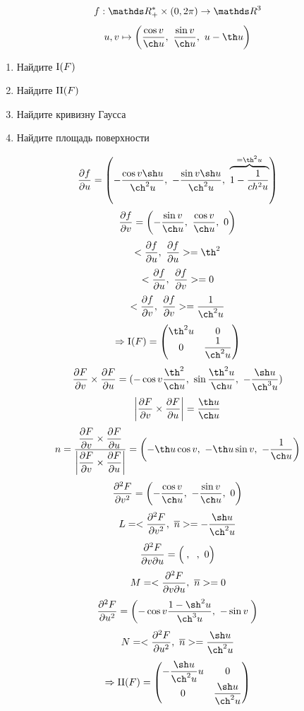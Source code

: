 \documentclass[main]{subfiles}
\begin{document}

    \begin{Example}
      \[f: \R_+^* \times (0, 2\pi) \ra \R^3\]
      \[u,v \mapsto \Br{\dfrac{\cos v}{\ch u},\ \dfrac{\sin v}{\ch u},\ u - \th u}\]
      \begin{enumerate}
        \item Найдите $\RNumb{1}(F)$
        \item Найдите $\RNumb{2}(F)$
        \item Найдите кривизну Гаусса
        \item Найдите площадь поверхности
      \end{enumerate}
    \end{Example}

    \begin{Sol}
      \[\dfrac{\d f}{\d u} = \Br{-\dfrac{\cos v \sh u}{\ch^2 u},\ -\dfrac{\sin v \sh u}{\ch^2 u},\ \ob{= \th^2 u}{1 - \dfrac{1}{ch^2 u}}}\]
      \[\dfrac{\d f}{\d v} = \Br{-\dfrac{\sin v}{\ch u},\ \dfrac{\cos v}{\ch u},\ 0}\]
      \[<\dfrac{\d f}{\d u},\ \dfrac{\d f}{\d u}> = \th^2\]
      \[<\dfrac{\partial f}{\partial u},\ \dfrac{\partial f}{\partial v}> = 0\]
      \[<\dfrac{\d f}{\d v},\ \dfrac{\d f}{\d v}> = \dfrac{1}{\ch^2 u}\]
      \[\Ra \RNumb{1}(F) = \begin{pmatrix}
        {}\th^2 u & 0\\
        0 & \dfrac{1}{\ch^2 u}
      \end{pmatrix}\]
      \[\frac{\d F}{\d v} \times \frac{\d F}{\d u} =
      (
        -\cos v \dfrac{\th^2}{\ch u},\
        \sin \dfrac{\th^2 u}{\ch u},\
        -\dfrac{\sh u}{\ch^3 u}
      )\]
      \[\abs{\dfrac{\d F}{\d v} \times \dfrac{\d F}{\d u}} = \dfrac{\th u}{\ch u}\]
      \[n =
      \dfrac{
        \dfrac{\d F}{\d v} \times \dfrac{\d F}{\d u}
      }{
        \abs{\dfrac{\d F}{\d v} \times \dfrac{\d F}{\d u}}
      } = \Br{- \th u \cos v,\ -\th u \sin v,\ -\dfrac{1}{\ch u}}\]
      \[\frac{\d^2 F}{\d v^2} = \Br{-\dfrac{\cos v}{\ch u},\ -\dfrac{\sin v}{\ch u},\ 0}\]
      \[L = <\frac{\d^2 F}{\d v^2},\ \ol{n}> = -\dfrac{\sh u}{\ch^2 u}\]
      \[\frac{\partial^2 F}{\partial v \partial u} = \left(\dfrac{}{},\ \dfrac{}{},\ 0\right)\]
      \[M = <\frac{\partial^2 F}{\partial v \partial u},\ \overline{n}> = 0\]
      \[\frac{\d^2 F}{\d u^2} = \Br{-\cos v \dfrac{1-\sh^2 u}{\ch^3 u},\ -\sin v \dfrac{}{}}\]
      \[N = <\frac{\d^2 F}{\d u^2},\ \ol{n}> = \dfrac{\sh u}{\ch^2 u}\]
      \[\Ra \RNumb{2}(F) = \begin{pmatrix}
        -\dfrac{\sh u}{\ch^2 u} u & 0\\
        0 & \dfrac{\sh u}{\ch^2 u}
      \end{pmatrix}\]


\end{Sol}
\end{document}
